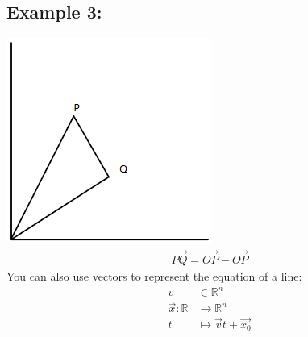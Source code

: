 \documentclass[a4paper,12pt]{article}
\begin{document}
\subsection*{Example 3:}
\includegraphics[scale=0.5]{fig2} \\
\begin{align*}
\overrightarrow{PQ} = \overrightarrow{OP} - \overrightarrow{OP}
\end{align*}
You can also use vectors to represent the equation of a line:
\begin{align*}
v & \in \mathbb{R}^n \\
\vec{x}: \mathbb{R} & \rightarrow \mathbb{R}^n \\
t & \mapsto \vec{v}t + \vec{x_0} \\
\end{align*}
\end{document}
